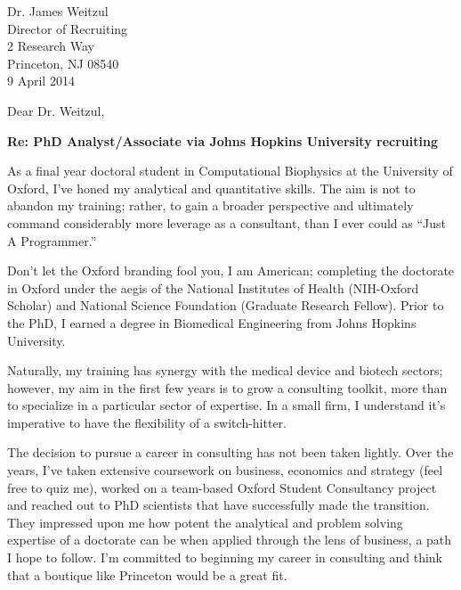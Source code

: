 \documentclass[a4paper]{../res}
\begin{document}
 
\begin{sloppypar}
 
%


\begin{resume} 
Dr. James Weitzul  \\
Director of Recruiting  \\
2 Research Way \\
Princeton, NJ 08540 \\
 
9 April 2014



Dear Dr. Weitzul,

\textbf{Re: PhD Analyst/Associate via Johns Hopkins University recruiting}

As a final year doctoral student in Computational Biophysics at the University of Oxford, I've honed my analytical and quantitative skills. The aim is not to abandon my training; rather, to gain a broader perspective and ultimately command considerably more leverage as a consultant, than I ever could as ``Just A Programmer.'' 

Don't let the Oxford branding fool you, I am American; completing the doctorate in Oxford under the aegis of the National Institutes of Health (NIH-Oxford Scholar) and National Science Foundation (Graduate Research Fellow). Prior to the PhD, I earned a degree in Biomedical Engineering from Johns Hopkins University.

Naturally, my training has synergy with the medical device and biotech sectors; however, my aim in the first few years is to grow a consulting toolkit, more than to specialize in a particular sector of expertise. In a small firm, I understand it's imperative to have the flexibility of a switch-hitter.

The decision to pursue a career in consulting has not been taken lightly. Over the years, I've taken extensive coursework on business, economics and strategy (feel free to quiz me), worked on a team-based Oxford Student Consultancy project and reached out to PhD scientists that have successfully made the transition. They impressed upon me how potent the analytical and problem solving expertise of a doctorate can be when applied through the lens of business, a path I hope to follow. I'm committed to beginning my career in consulting and think that a boutique like Princeton would be a great fit.


\end{resume}
\end{sloppypar}
\end{document}
